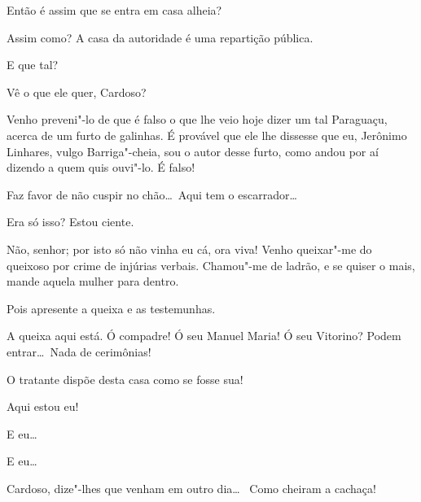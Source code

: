 

 Então é assim que se entra em casa alheia?

  Assim como? A casa da autoridade é uma
repartição pública. 

 E que tal?

 Vê o que ele quer, Cardoso?

 Venho preveni"-lo de que é falso o que lhe veio hoje dizer um
tal Paraguaçu, acerca de um furto de
galinhas. É provável que ele lhe dissesse que eu, Jerônimo Linhares,
vulgo Barriga"-cheia, sou o autor desse
furto, como andou por aí dizendo a quem quis ouvi"-lo. É falso!

  Faz favor de
não cuspir no chão\ldots\ Aqui tem o escarrador\ldots
{}

 Era só isso? Estou ciente.

 Não, senhor; por isto só não vinha eu cá, ora viva! Venho
queixar"-me do queixoso por crime de
injúrias verbais. Chamou"-me de ladrão, e se quiser o mais, mande aquela
mulher para dentro. 

 Pois apresente a queixa e as testemunhas.

 A queixa aqui está.  Ó compadre! Ó seu Manuel Maria! Ó seu Vitorino? Podem
entrar\ldots\ Nada de cerimônias!

  O tratante dispõe desta casa como se
fosse sua!



  Aqui estou eu!

  E eu\ldots

  E eu\ldots

 Cardoso, dize"-lhes que venham em outro dia\ldots\  Como cheiram a cachaça!

